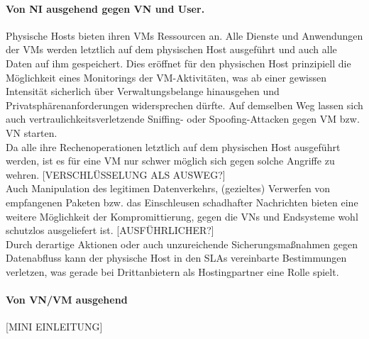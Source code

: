 \paragraph{Von NI ausgehend gegen VN und User.}
\label{parag:vonNI}
Physische Hosts bieten ihren VMs Ressourcen an. Alle Dienste und Anwendungen der VMs werden letztlich auf dem physischen Host ausgeführt und auch alle Daten auf ihm gespeichert. Dies eröffnet für den physischen Host prinzipiell die Möglichkeit eines Monitorings der VM-Aktivitäten, was ab einer gewissen Intensität sicherlich über Verwaltungsbelange hinausgehen und Privatsphärenanforderungen widersprechen dürfte. Auf demselben Weg lassen sich auch vertraulichkeitsverletzende Sniffing- oder Spoofing-Attacken gegen VM bzw. VN starten. \\
Da alle ihre Rechenoperationen letztlich auf dem physischen Host ausgeführt werden, ist es für eine VM nur schwer möglich sich gegen solche Angriffe zu wehren. [VERSCHLÜSSELUNG ALS AUSWEG?]\\
Auch Manipulation des legitimen Datenverkehrs, (gezieltes) Verwerfen von empfangenen Paketen bzw. das Einschleusen schadhafter Nachrichten bieten eine weitere Möglichkeit der Kompromittierung, gegen die VNs und Endsysteme wohl schutzlos ausgeliefert ist.
[AUSFÜHRLICHER?]\\
Durch derartige Aktionen oder auch unzureichende Sicherungsmaßnahmen gegen Datenabfluss kann der physische Host in den SLAs vereinbarte Bestimmungen verletzen, was gerade bei Drittanbietern als Hostingpartner eine Rolle spielt.



\paragraph{Von VN/VM ausgehend}
\label{parag:vonVN}
[MINI EINLEITUNG]


